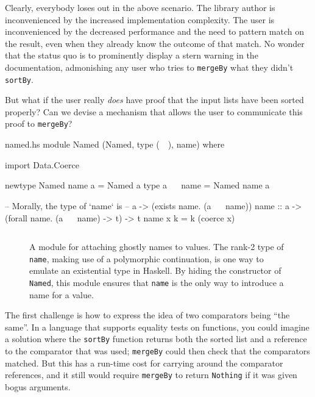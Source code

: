 \documentclass[format=sigplan, review=false, screen=true, 10pt]{acmart}
\makeatletter
\let\origsubsection\subsection
\renewcommand\subsection{\@ifstar{\starsubsection}{\nostarsubsection}}
\newcommand\nostarsubsection[1]
{\subsectionprelude\origsubsection{#1}\subsectionpostlude}
\newcommand\starsubsection[1]
{\subsectionprelude\origsubsection*{#1}\subsectionpostlude}
\newcommand\subsectionprelude{%
  \vspace{-0.25em}
}
\newcommand\subsectionpostlude{%
  \vspace{-0.05em}
}
\makeatother
\begin{document}
Clearly, everybody loses out in the above scenario. The
library author is inconvenienced by the increased implementation complexity.
The user is inconvenienced by the decreased performance and the need to
pattern match on the result, even when they  already know the
outcome of that match. No wonder that the status quo is to prominently display
a stern warning in the documentation, admonishing
any user who tries to \texttt{mergeBy} what they didn't \texttt{sortBy}.

But what if the user really \emph{does} have proof that the input lists have
been sorted properly? Can we devise a mechanism that allows the user to communicate
this proof to \texttt{mergeBy}?

\subsection{Conjuring a name}

\begin{filecontents*}{named.hs}
module Named (Named, type (~~), name) where

import Data.Coerce

newtype Named name a = Named a
type a ~~ name = Named name a

-- Morally, the type of `name` is
--      a -> (exists name. (a ~~ name))
name :: a -> (forall name. (a ~~ name) -> t) -> t
name x k = k (coerce x)
\end{filecontents*}
\begin{figure}[b]
  \inputminted{haskell}{named.hs}
  \caption{A module for attaching ghostly names to values. The rank-2 type of \texttt{name},
    making use of a polymorphic continuation, is one way to emulate an existential type in
    Haskell. By hiding the constructor of \texttt{Named}, this module ensures that \texttt{name}
    is the only way to introduce a name for a value.
    \label{name-module}}
\end{figure}


The first challenge is how to express the idea of two  comparators
being ``the same''. In a language that supports equality tests on functions,
you could imagine a solution where the \texttt{sortBy} function returns both the sorted
list and a reference to the comparator that was used; \texttt{mergeBy} could
then check that the comparators matched. But this has a run-time cost for carrying
around the comparator references, and it still would require \texttt{mergeBy} to
return \texttt{Nothing} if it was given bogus arguments.
\end{document}

